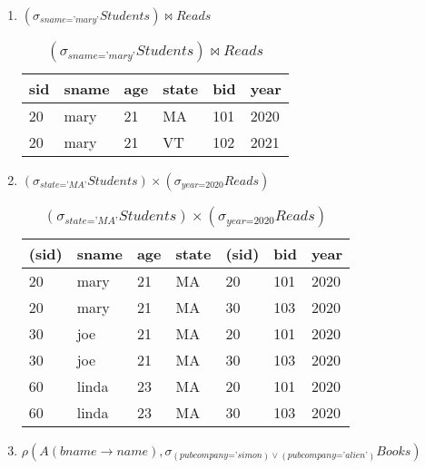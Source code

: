 \documentclass[letterpaper, 11pt]{article}
\begin{document}
\begin{enumerate}[label={\alph*})]
    \item $(\sigma_{\textit{sname='mary'}}\textit{Students}) \bowtie \textit{Reads}$
    \begin{table}[H]
        \centering
        \caption*{$(\sigma_{\textit{sname='mary'}}\textit{Students}) \bowtie \textit{Reads}$}
        \begin{tabular}{|l|l|l|l|l|l|}
            \hline
            \cellcolor[HTML]{b4c6e7} sid & \cellcolor[HTML]{b4c6e7} sname & \cellcolor[HTML]{b4c6e7} age & \cellcolor[HTML]{b4c6e7} state & \cellcolor[HTML]{b4c6e7} bid & \cellcolor[HTML]{b4c6e7} year \\
            \hline
            20 & mary & 21 & MA & 101 & 2020 \\
            \hline
            20 & mary & 21 & VT & 102 & 2021 \\
            \hline
        \end{tabular}
    \end{table}
    \item $(\sigma_{\textit{state='MA'}}\textit{Students}) \times (\sigma_{\textit{year=2020}}\textit{Reads})$
    \begin{table}[H]
        \centering
        \caption*{$(\sigma_{\textit{state='MA'}}\textit{Students}) \times (\sigma_{\textit{year=2020}}\textit{Reads})$}
        \begin{tabular}{|l|l|l|l|l|l|l|}
        \hline
            \cellcolor[HTML]{b4c6e7} (sid) & \cellcolor[HTML]{b4c6e7} sname & \cellcolor[HTML]{b4c6e7} age & \cellcolor[HTML]{b4c6e7} state & \cellcolor[HTML]{b4c6e7} (sid) & \cellcolor[HTML]{b4c6e7} bid & \cellcolor[HTML]{b4c6e7} year \\
            \hline
            20 & mary & 21 & MA & 20 & 101 & 2020 \\
            \hline
            20 & mary & 21 & MA & 30 & 103 & 2020 \\
            \hline
            30 & joe & 21 & MA & 20 & 101 & 2020 \\
            \hline
            30 & joe & 21 & MA & 30 & 103 & 2020 \\
            \hline
            60 & linda & 23 & MA & 20 & 101 & 2020 \\
            \hline
            60 & linda & 23 & MA & 30 & 103 & 2020 \\
            \hline
        \end{tabular}
    \end{table}
    \item $\rho(A(\textit{bname} \to \textit{name}), \sigma_{(\textit{pubcompany='simon})\vee (\textit{pubcompany='alien'})} \textit{Books})$

\end{enumerate}
\end{document}
